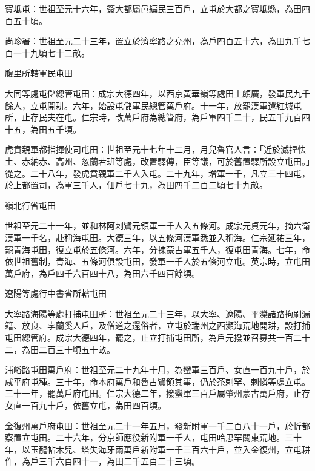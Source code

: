 \begin{pinyinscope}
 寶坻屯：世祖至元十六年，簽大都屬邑編民三百戶，立屯於大都之寶坻縣，為田四百五十頃。



 尚珍署：世祖至元二十三年，置立於濟寧路之兗州，為戶四百五十六，為田九千七百一十九頃七十二畝。



 腹里所轄軍民屯田



 大同等處屯儲總管屯田：成宗大德四年，以西京黃華嶺等處田土頗廣，發軍民九千餘人，立屯開耕。六年，始設屯儲軍民總管萬戶府。十一年，放罷漢軍還紅城屯所，止存民夫在屯。仁宗時，改萬戶府為總管府，為戶軍四千二十，民五千九百四十五，為田五千頃。



 虎賁親軍都指揮使司屯田：世祖至元十七年十二月，月兒魯官人言：「近於滅捏怯土、赤納赤、高州、忽蘭若班等處，改置驛傳，臣等議，可於舊置驛所設立屯田。」從之。二十八年，發虎賁親軍二千人入屯。二十九年，增軍一千，凡立三十四屯，於上都置司，為軍三千人，佃戶七十九，為田四千二百二頃七十九畝。



 嶺北行省屯田



 世祖至元二十一年，並和林阿剌鷿元領軍一千人入五條河。成宗元貞元年，摘六衛漢軍一千名，赴稱海屯田。大德三年，以五條河漢軍悉並入稱海。仁宗延祐三年，罷青海屯田，復立屯於五條河。六年，分揀蒙古軍五千人，復屯田青海。七年，命依世祖舊制，青海、五條河俱設屯田，發軍一千人於五條河立屯。英宗時，立屯田萬戶府，為戶四千六百四十八，為田六千四百餘頃。



 遼陽等處行中書省所轄屯田



 大寧路海陽等處打捕屯田所：世祖至元二十三年，以大寧、遼陽、平灤諸路拘刷漏籍、放良、孛蘭奚人戶，及僧道之還俗者，立屯於瑞州之西瀕海荒地開耕，設打捕屯田總管府。成宗大德四年，罷之，止立打捕屯田所，為戶元撥並召募共一百二十二，為田二百三十頃五十畝。



 浦峪路屯田萬戶府：世祖至元二十九年十月，為蠻軍三百戶、女直一百九十戶，於咸平府屯種。三十年，命本府萬戶和魯古鷿領其事，仍於茶剌罕、剌憐等處立屯。三十一年，罷萬戶府屯田。仁宗大德二年，撥蠻軍三百戶屬肇州蒙古萬戶府，止存女直一百九十戶，依舊立屯，為田四百頃。



 金復州萬戶府屯田：世祖至元二十一年五月，發新附軍一千二百八十一戶，於忻都察置立屯田。二十六年，分京師應役新附軍一千人，屯田哈思罕關東荒地。三十年，以玉龍帖木兒、塔失海牙兩萬戶新附軍一千三百六十戶，並入金復州，立屯耕作，為戶三千六百四十一，為田二千五百二十三頃。




\end{pinyinscope}
